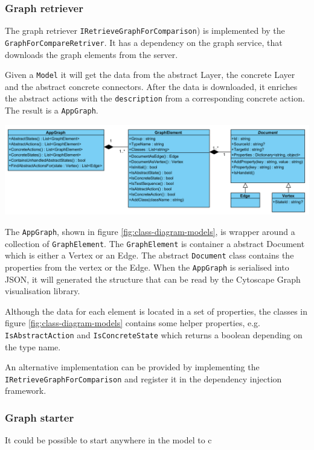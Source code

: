 \subsubsection{Graph retriever}
The graph retriever \verb|IRetrieveGraphForComparison|) is implemented by the \verb|GraphForCompareRetriver|. It has a dependency on the graph service, that downloads the graph elements from the server. 

Given a \verb|Model| it will get the data from the abstract Layer, the concrete Layer and the abstract concrete connectors. After the data is downloaded, it enriches the abstract actions with the \verb|description| from a corresponding concrete action. The result is a \verb|AppGraph|.

\begingroup
\captionsetup{type=figure}
\includegraphics[scale=0.6]{thesis/images/4-UML-Models.png}
\label{fig:class-diagram-models}
\endgroup

The \verb|AppGraph|, shown in figure \ref{fig:class-diagram-models}, is wrapper around a collection of \verb|GraphElement|. The \verb|GraphElement| is container a abstract Document which is either a Vertex or an Edge. The abstract \verb|Document| class contains the properties from the vertex or the Edge. When the \verb|AppGraph| is serialised into JSON, it will generated the structure that can be read by the Cytoscape Graph visualisation library.

Although the data for each element is located in a set of properties, the classes in figure \ref{fig:class-diagram-models} contains some helper properties, e.g. \verb|IsAbstractAction| and \verb|IsConcreteState| which returns a boolean depending on the type name. 

An alternative implementation can be provided by implementing the \verb|IRetrieveGraphForComparison| and register it in the dependency injection framework.

\subsubsection{Graph starter}
It could be possible to start anywhere in the model to c


